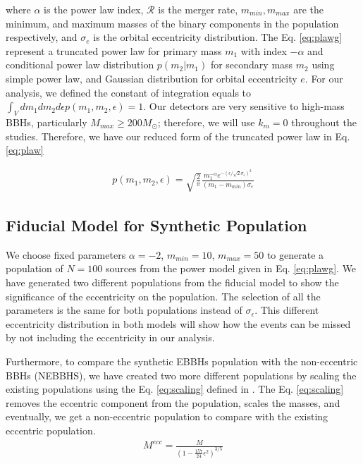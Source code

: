 \documentclass[twocolumn,prd,nofootinbib]{revtex4}
\begin{document}
where $\alpha$ is the power law index, $\mathcal{R}$ is the merger rate, $m_{min}, m_{max}$ are the minimum, and maximum masses of the binary components in the population respectively, and $\sigma_e$ is the orbital eccentricity distribution. The Eq. \ref{eq:plawg} represent a truncated power law for primary mass $m_1$ with index $-\alpha$ and conditional power law distribution $p(m_2|m_1)$ for secondary mass $m_2$ using simple power law, and Gaussian distribution for orbital eccentricity $e$. 
For our analysis, we defined the constant of integration equals to $\int_V dm_1 dm_2 d\epsilon p(m_1,m_2,\epsilon) = 1$.  Our detectors are very sensitive to high-mass BBHs, particularly $M_{max}\geq 200 M_\odot$; therefore, we will use $k_m=0$ throughout the studies. Therefore, we have our reduced form of the truncated power law in Eq. \ref{eq:plaw}

\begin{align}
\label{eq:plaw}
p(m_1,m_2,\epsilon) =   \sqrt{\frac{2}{\pi}} \frac{ m_1^{-\alpha}  e^{-(\epsilon/\sqrt{2}\sigma_\epsilon)^2}}{(m_1-m_{min})\sigma_\epsilon}  
\end{align}

\subsection{Fiducial Model for Synthetic Population}

We choose fixed parameters $\alpha = -2$, $m_{min} = 10$, $m_{max}=50$ to generate a population of $N=100$ sources from the power model given in Eq. \ref{eq:plawg}. We have generated two different populations from the fiducial model to show the significance of the eccentricity on the population. The selection of all the parameters is the same for both populations instead of $\sigma_\epsilon$. This different eccentricity distribution in both models will show how the events can be missed by not including the eccentricity in our analysis.

Furthermore, to compare the synthetic EBBHs population with the non-eccentric BBHs (NEBBHS), we have created two more different populations by scaling the existing populations using the Eq. \ref{eq:scaling} defined in \cite{2021_scaling_paper}. The Eq. \ref{eq:scaling} removes the eccentric component from the population, scales the masses, and eventually, we get a non-eccentric population to compare with the existing eccentric population.
\begin{align}
\label{eq:scaling}
M^{ecc} = \frac{M}{(1-\frac{157}{24}\epsilon^2)^{3/5}}
\end{align}
\end{document}
